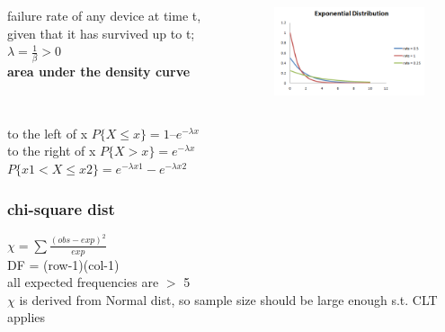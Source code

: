 \documentclass{beamer}
\begin{document}
\begin{frame}%
	\begin{columns}
		\begin{column}{0.45\textwidth}
			failure rate of any device at time t, given that it has survived up to t; $\lambda = \frac{1}{\beta} > 0 $
			\\ 
			\textbf{area under the density curve}
		\end{column}
		\begin{column}{0.5\textwidth}
			\begin{figure}
				\includegraphics[scale=0.5]{exponential}
			\end{figure}
		\end{column}
	\end{columns}
			to the left of x
			 $P\{X \leq x\} = 1 – e^{-\lambda x}$
			\\ to the right of x $P\{X > x\} = e^{-\lambda x}$
			\\
			$P\{x1 < X \leq x2\} = e^{-\lambda x1} - e^{-\lambda x2}$

\end{frame}


\begin{frame}\frametitle{chi-square dist}
	$\chi = \sum\frac{(obs-exp)^2}{exp}$\\
	DF = (row-1)(col-1)\\
	all expected frequencies are $>$ 5\\
	$\chi$ is derived from Normal dist, so sample size should be large enough s.t. CLT applies
\end{frame}
\end{document}

